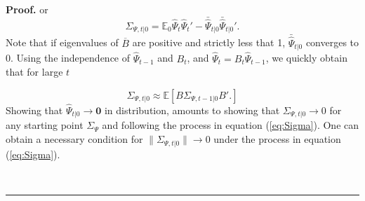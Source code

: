 \documentclass[thmsb,11pt]{article}
\newenvironment{proof}[1][Proof]{\noindent \textbf{#1.} }{\  \rule{0.5em}{0.5em}}
\begin{document}
\begin{appendix}
\begin{proof}
 	or
 	\begin{equation}
 	 \Sigma_{\Psi,t|0}=\mathbb{E}_{0}\hat{\Psi}_t\hat{\Psi}_t'- \bar{\hat{\Psi}}_{t|0} \bar{\hat{\Psi}}_{t|0} '.
 	\end{equation}
Note that  if eigenvalues of $\overline B$ are positive and strictly less that 1, $\bar{\hat{\Psi}}_{t|0} $ converges to 0.  Using the independence of $\hat{\Psi}_{t-1}$ and $B_t$, and $\hat{\Psi}_t = B_t \hat{\Psi}_{t-1}$, we quickly obtain that for large $t$
 	
	\begin{equation}
		\Sigma_{\Psi,t|0} \approx \mathbb{E}[B \Sigma_{\Psi,t-1|0} B'.] \label{eq:Sigma}
	\end{equation}  Showing that $\hat{\Psi}_{t|0} \rightarrow \bm 0$ in distribution, amounts to showing that $\Sigma_{\Psi,t|0}\rightarrow 0$ for any starting point $\Sigma_{\Psi}$ and following the process in equation (\ref{eq:Sigma}).  One can obtain a necessary condition for $\|\Sigma_{\Psi,t|0}\|\rightarrow 0$ under the process in equation (\ref{eq:Sigma}).

\end{proof}
\end{appendix}
\end{document}
